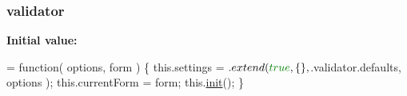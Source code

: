 \subsubsection[{validator}]{\setlength{\rightskip}{0pt plus 5cm}validator}\label{packages_2j_query_8_validation_81_811_81_2_content_2_scripts_2jquery_8validate-vsdoc_8js_a2dc8272bb221cdffcccbd20db038f172}
{\bfseries Initial value\+:}
\begin{DoxyCode}
= \textcolor{keyword}{function}( options, form ) \{
    this.settings = $.extend( \textcolor{keyword}{true}, \{\}, $.validator.defaults, options );
    this.currentForm = form;
    this.\hyperlink{jquery-1_810_82-vsdoc_8js_a4d7eae8a73366d18982efeb109237a74}{init}();
\}
\end{DoxyCode}
